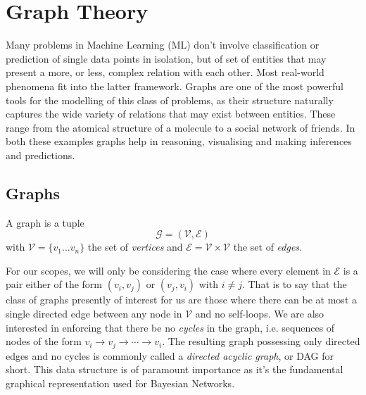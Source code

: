 \section{Graph Theory} \label{sec:graph-theory}
Many problems in Machine Learning (ML) don't involve classification or prediction of single data points in isolation, but of set of entities that may present a more, or less, complex relation with each other. 
Most real-world phenomena fit into the latter framework.
Graphs are one of the most powerful tools for the modelling of this class of problems, as their structure naturally captures the wide variety of relations that may exist between entities.
These range from the atomical structure of a molecule to a social network of friends.  
In both these examples graphs help in reasoning, visualising and making inferences and predictions.

\subsection{Graphs} \label{subsec:graphs}
\begin{definition}
	A graph is a tuple 
	\begin{equation}
	\mathcal{G} = (\mathcal{V}, \mathcal{E})
\end{equation}
with $\mathcal{V} = \{ v_1 \ldots v_n \}$ the set of \textit{vertices} and $\mathcal{E} = \mathcal{V} \times \mathcal{V}$ the set of \textit{edges}.
\end{definition}

For our scopes, we will only be considering the case where every element in $\mathcal{E}$ is a pair either of the form $(v_i, v_j)$ or $(v_j, v_i)$ with $i \neq j$.  
That is to say that the class of graphs presently of interest for us are those where there can be at most a single directed edge between any node in $\mathcal{V}$ and no self-loops.
We are also interested in enforcing that there be no \textit{cycles} in the graph, i.e. sequences of nodes of the form $v_i \rightarrow v_j \rightarrow \cdots \rightarrow v_i$.
The resulting graph possessing only directed edges and no cycles is commonly called a \textit{directed acyclic graph}, or DAG for short.  
This data structure is of paramount importance as it's the fundamental graphical representation used for Bayesian Networks.

